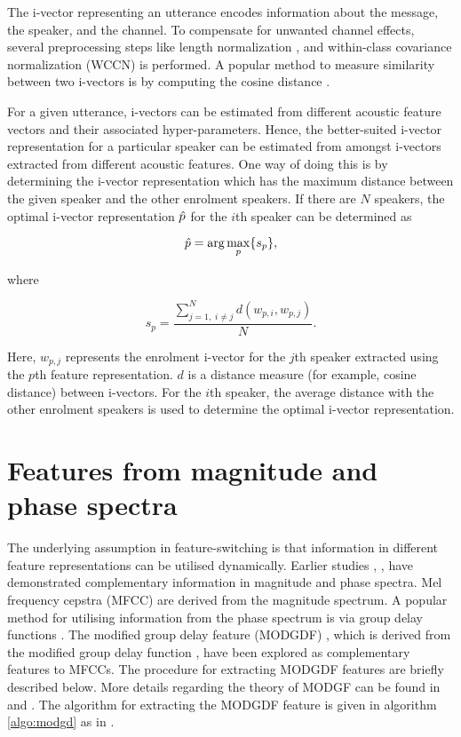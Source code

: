 \documentclass{article}
\begin{document}
The i-vector representing an utterance encodes information about the message,
the speaker, and the channel. To compensate for unwanted channel effects,
several preprocessing steps like length normalization \cite{garcia_lengthNorm},
and within-class covariance normalization (WCCN) \cite{wccn} is performed. A
popular method to measure similarity between two i-vectors is by computing the
cosine distance \cite{dehak_ivector}.

For a given utterance, i-vectors can be estimated from different acoustic
feature vectors and their associated hyper-parameters. Hence, the
better-suited i-vector representation for a particular speaker can be estimated
from amongst i-vectors extracted from different acoustic features. One way of
doing this is by determining the i-vector representation which has the maximum
distance between the given speaker and the other enrolment speakers. If there
are $N$ speakers, the optimal i-vector representation $\Hat{p}$ 
for the $i$th speaker can be determined as

\begin{equation}
\Hat{p} = \arg\max_p \{s_p\},
\label{eq:opt_ivec}
\end{equation}

where 

\begin{equation}
s_p = \frac{\displaystyle \sum_{j=1, \; i \neq j}^N d(w_{p,i},w_{p,j})}{N}.
\label{eq:sp}
\end{equation}

Here, $w_{p,j}$ represents the enrolment i-vector for the $j$th speaker
extracted using the $p$th feature representation. $d$ is a distance measure (for
example, cosine distance) between i-vectors. For the $i$th speaker, the average
distance with the other enrolment speakers is used to determine the optimal
i-vector representation. 

\section{Features from magnitude and phase spectra}
\label{sec:featExt}

The underlying assumption in feature-switching is that information in different
feature representations can be utilised dynamically. Earlier studies
\cite{complement1}, \cite{complement2}, \cite{mgd_complement} have demonstrated
complementary information in magnitude and phase spectra. Mel frequency cepstra
(MFCC) are derived from the magnitude spectrum. A popular method for utilising
information from the phase spectrum is via group delay functions
\cite{group_delay}. The modified group delay feature (MODGDF) \cite{modgd_feat},
which is derived from the modified group delay function \cite{modgd_func}, have
been explored as complementary features to MFCCs. The procedure for extracting
MODGDF features are briefly described below. More details regarding the theory
of MODGF can be found in \cite{modgd_func} and \cite{modgd_feat}. The algorithm
for extracting the MODGDF feature is given in algorithm \ref{algo:modgd} as 
in \cite{hegdeModgdf}.
\end{document}
